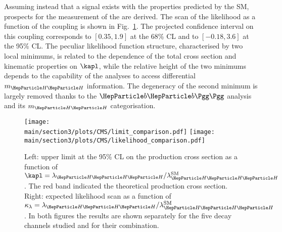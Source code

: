 Assuming instead that a \HH signal exists with the properties predicted by the SM, prospects for the measurement of the \lambdahhh are derived.
The scan of the likelihood as a function of the \kapl coupling is shown in Fig.~\ref{sec3:CMSHH:fig:comb_plots}.
The projected confidence interval on this coupling corresponds to $[0.35, 1.9]$ at the 68\% CL and to $[-0.18, 3.6]$ at the 95\% CL.
The peculiar likelihood function structure, characterised by two local minimums, is related to the dependence of the total cross section and \HH kinematic properties on $\kapl$, while the relative height of the two minimums depends to the capability of the analyses to access differential $m_{\HH}$ information.
The degeneracy of the second minimum is largely removed thanks to the $\bbgg$ analysis and its $m_{\HH}$ categorisation.



\begin{figure}[htbH]
  \centering
   \texttt{[image: \\main/section3/plots/CMS/limit\_comparison.pdf]}
    \texttt{[image: \\main/section3/plots/CMS/likelihood\_comparison.pdf]}
    \caption{Left: upper limit at the 95\% CL on the \HH production cross section as a function of $\kapl = \lambdahhh/\lambdahhh^\text{SM}$. The red band indicated the theoretical production cross section. Right: expected likelihood scan as a function of $\kappa_\lambda = \lambdahhh/\lambdahhh^\text{SM}$. In both figures the results are shown separately for the five decay channels studied and for their combination.}
    \label{sec3:CMSHH:fig:comb_plots}
\end{figure}